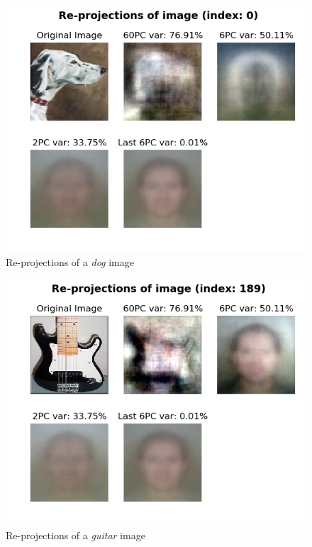 \documentclass[a4paper, 11pt]{article}
\begin{document}
	\begin{figure}[ht!]
		\centering
		\includegraphics[height=0.5\paperwidth]{img/fig01a.png}
		\caption{Re-projections of a \textit{dog} image}
		\label{fig:dog1}
	\end{figure}
	\begin{figure}[ht!]
		\centering
		\includegraphics[height=0.5\paperwidth]{img/fig01b.png}
		\caption{Re-projections of a \textit{guitar} image}
		\label{fig:guitar1}
	\end{figure}
\end{document}
